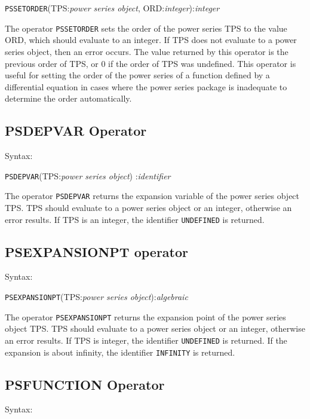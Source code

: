 \hspace*{2em} {\tt PSSETORDER}(TPS:{\em power series object},
ORD:{\em integer}):{\em integer}

The operator {\tt PSSETORDER} sets the order of the power series
TPS to the value ORD, which should evaluate to an integer. If
TPS does not evaluate to a power series object, then an error
occurs. The value returned by this operator is the previous order of
TPS, or 0 if the order of TPS was undefined.  This
operator is useful for setting the order of the power series of a
function defined by a differential equation in cases where the power
series package is inadequate to determine the order automatically.


\subsection{PSDEPVAR Operator}

Syntax:

\hspace*{2em} {\tt PSDEPVAR}(TPS:{\em power series object})
:{\em identifier}

The operator {\tt PSDEPVAR} returns the expansion variable of the
power series object TPS. TPS should evaluate to a power
series object or an integer, otherwise an error results. If TPS
is an integer, the identifier {\tt UNDEFINED} is returned.

\subsection{PSEXPANSIONPT operator}

Syntax:

\hspace*{2em}
{\tt PSEXPANSIONPT}(TPS:{\em power series object}):{\em algebraic}

The operator {\tt PSEXPANSIONPT} returns the expansion point of the
power series object TPS. TPS should evaluate to a power
series object or an integer, otherwise an error results. If TPS
is integer, the identifier {\tt UNDEFINED} is returned. If the
expansion is about infinity, the identifier {\tt INFINITY} is
returned.

\subsection{PSFUNCTION Operator}

Syntax:

